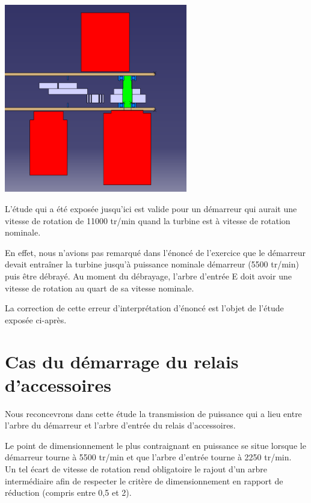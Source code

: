 \documentclass{config}
\begin{document}
\begin{spacing}{1.2}
\begin{center}
\includegraphics[width=0.6\textwidth, trim={7cm 5cm 2cm 3cm}, clip]{BE_3D_complet_ARO_coupe.PNG}
\end{center}

L'étude qui a été exposée jusqu'ici est valide pour un démarreur qui aurait une vitesse de rotation de 11000 tr/min quand la turbine est à vitesse de rotation nominale.

En effet, nous n'avions pas remarqué dans l'énoncé de l'exercice que le démarreur devait entraîner la turbine jusqu'à puissance nominale démarreur (5500 tr/min) puis être débrayé. Au moment du débrayage, l'arbre d'entrée E doit avoir une vitesse de rotation au quart de sa vitesse nominale.

La correction de cette erreur d'interprétation d'énoncé est l'objet de l'étude exposée ci-après.


\newpage
\section{Cas du démarrage du relais d'accessoires}
Nous reconcevrons dans cette étude la transmission de puissance qui a lieu entre l'arbre du démarreur et l'arbre d'entrée du relais d'accessoires.

Le point de dimensionnement le plus contraignant en puissance se situe lorsque le démarreur tourne à 5500 tr/min et que l'arbre d'entrée tourne à 2250 tr/min. 
\\Un tel écart de vitesse de rotation rend obligatoire le rajout d'un arbre intermédiaire afin de respecter le critère de dimensionnement en rapport de réduction (compris entre 0,5 et 2).


\end{spacing}
\end{document}
